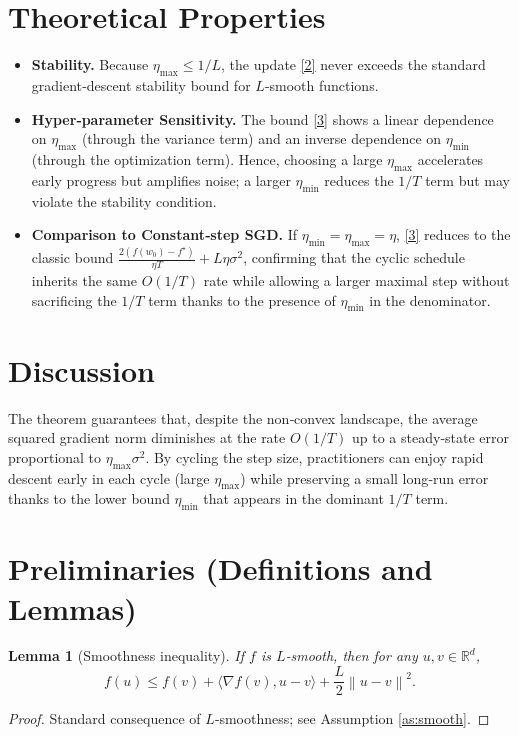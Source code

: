 \documentclass{article}
\newtheorem{lemma}{Lemma}
\newcommand{\RR}{\mathbb{R}}
\newcommand{\norm}[1]{\left\|#1\right\|}
\begin{document}
\section*{Theoretical Properties}
\begin{itemize}
\item \textbf{Stability.} Because $\eta_{\max}\le 1/L$, the update \eqref{2} never exceeds the
standard gradient‑descent stability bound for $L$‑smooth functions.
\item \textbf{Hyper‑parameter Sensitivity.}
The bound \eqref{3} shows a linear dependence on $\eta_{\max}$ (through the variance term)
and an inverse dependence on $\eta_{\min}$ (through the optimization term).  Hence,
choosing a large $\eta_{\max}$ accelerates early progress but amplifies noise; a larger
$\eta_{\min}$ reduces the $1/T$ term but may violate the stability condition.
\item \textbf{Comparison to Constant‑step SGD.}
If $\eta_{\min}=\eta_{\max}=\eta$, \eqref{3} reduces to the classic bound
$\frac{2(f(w_0)-f^{\star})}{\eta T}+L\eta\sigma^2$, confirming that the cyclic schedule
inherits the same $O(1/T)$ rate while allowing a larger maximal step without sacrificing
the $1/T$ term thanks to the presence of $\eta_{\min}$ in the denominator.
\end{itemize}

\section*{Discussion}
The theorem guarantees that, despite the non‑convex landscape,
the average squared gradient norm diminishes at the rate $O(1/T)$ up to a
steady‑state error proportional to $\eta_{\max}\sigma^2$.
By cycling the step size, practitioners can enjoy rapid descent early in each
cycle (large $\eta_{\max}$) while preserving a small long‑run error thanks to the
lower bound $\eta_{\min}$ that appears in the dominant $1/T$ term.

\newpage

\section*{Preliminaries (Definitions and Lemmas)}
\begin{lemma}[Smoothness inequality]\label{lem:smooth}
If $f$ is $L$‑smooth, then for any $u,v\in\RR^{d}$,
\[
f(u)\le f(v)+\langle\nabla f(v),u-v\rangle+\frac{L}{2}\norm{u-v}^2 .
\tag{L1}
\]
\end{lemma}
\begin{proof}
Standard consequence of $L$‑smoothness; see Assumption \ref{as:smooth}. \qedhere
\end{proof}
\end{document}
